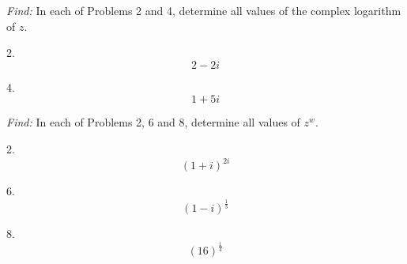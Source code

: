 \documentclass[11pt]{homework}
\begin{document}
\newpage
{}
\emph{Find:}
In each of Problems 2 and 4,
determine all values of the 
complex logarithm of $z$.

2. 
\begin{equation*}
  2 - 2i
\end{equation*}

4. 
\begin{equation*}
  1 + 5i
\end{equation*}

\emph{Find:}
In each of Problems 2, 6 and 8,
determine all values of $z^w$.

2.
\begin{equation*}
  (1+i)^{2i}
\end{equation*}

6.
\begin{equation*}
  (1-i)^{\frac{1}{3}}
\end{equation*}

8.
\begin{equation*}
  (16)^{\frac{1}{4}}
\end{equation*}
\end{document}
